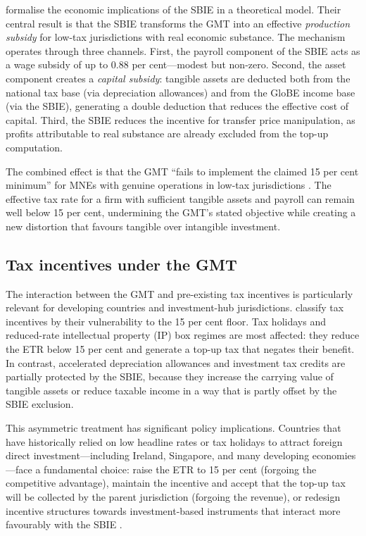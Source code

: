 \documentclass[12pt,a4paper]{article}
\begin{document}
\textcite{schjelderup2024} formalise the economic implications of the SBIE in a theoretical model.
Their central result is that the SBIE transforms the GMT into an effective \emph{production subsidy} for low-tax jurisdictions with real economic substance.
The mechanism operates through three channels.
First, the payroll component of the SBIE acts as a wage subsidy of up to 0.88 per cent---modest but non-zero.
Second, the asset component creates a \emph{capital subsidy}: tangible assets are deducted both from the national tax base (via depreciation allowances) and from the GloBE income base (via the SBIE), generating a double deduction that reduces the effective cost of capital.
Third, the SBIE reduces the incentive for transfer price manipulation, as profits attributable to real substance are already excluded from the top-up computation.

The combined effect is that the GMT ``fails to implement the claimed 15 per cent minimum'' for MNEs with genuine operations in low-tax jurisdictions \parencite{schjelderup2024}.
The effective tax rate for a firm with sufficient tangible assets and payroll can remain well below 15 per cent, undermining the GMT's stated objective while creating a new distortion that favours tangible over intangible investment.

\subsection{Tax incentives under the GMT}

The interaction between the GMT and pre-existing tax incentives is particularly relevant for developing countries and investment-hub jurisdictions.
\textcite{liotti2022} classify tax incentives by their vulnerability to the 15 per cent floor.
Tax holidays and reduced-rate intellectual property (IP) box regimes are most affected: they reduce the ETR below 15 per cent and generate a top-up tax that negates their benefit.
In contrast, accelerated depreciation allowances and investment tax credits are partially protected by the SBIE, because they increase the carrying value of tangible assets or reduce taxable income in a way that is partly offset by the SBIE exclusion.

This asymmetric treatment has significant policy implications.
Countries that have historically relied on low headline rates or tax holidays to attract foreign direct investment---including Ireland, Singapore, and many developing economies---face a fundamental choice: raise the ETR to 15 per cent (forgoing the competitive advantage), maintain the incentive and accept that the top-up tax will be collected by the parent jurisdiction (forgoing the revenue), or redesign incentive structures towards investment-based instruments that interact more favourably with the SBIE \parencite{liotti2022}.
\end{document}
